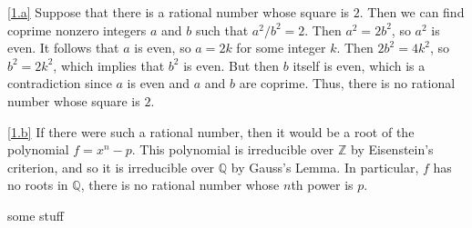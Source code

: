 \documentclass[boxes]{homework}
\begin{document}

\begin{problem}
\end{problem}

\begin{solution}
    \ref{1.a}
    Suppose that there is a rational number whose square is $2$.
    Then we can find coprime nonzero integers $a$ and $b$ such that $a^2 / b^2 = 2$.
    Then $a^2 = 2 b^2$, so $a^2$ is even.
    It follows that $a$ is even, so $a = 2 k$ for some integer $k$.
    Then $2 b^2 = 4 k^2$, so $b^2 = 2 k^2$, which implies that $b^2$ is even.
    But then $b$ itself is even, which is a contradiction since $a$ is even and $a$
    and $b$ are coprime.
    Thus, there is no rational number whose square is $2$.

    \ref{1.b}
    If there were such a rational number, then it would be a root of the polynomial
    $f = x^n - p$.
    This polynomial is irreducible over $\mathbb{Z}$ by Eisenstein's criterion, and
    so it is irreducible over $\mathbb{Q}$ by Gauss's Lemma.
    In particular, $f$ has no roots in $\mathbb Q$, there is no rational number
    whose $n$th power is $p$.
\end{solution}

\begin{mytheo}{}
    some stuff
\end{mytheo}
\end{document}
